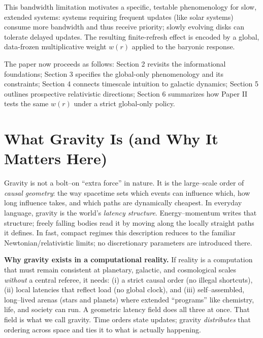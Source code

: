 \documentclass[usenatbib]{mnras}
\begin{document}
This bandwidth limitation motivates a specific, testable phenomenology for slow, extended systems: systems requiring frequent updates (like solar systems) consume more bandwidth and thus receive priority; slowly evolving disks can tolerate delayed updates. The resulting finite-refresh effect is encoded by a global, data-frozen multiplicative weight $w(r)$ applied to the baryonic response.

The paper now proceeds as follows: Section 2 revisits the informational foundations; Section 3 specifies the global-only phenomenology and its constraints; Section 4 connects timescale intuition to galactic dynamics; Section 5 outlines prospective relativistic directions; Section 6 summarizes how Paper II tests the same $w(r)$ under a strict global-only policy.

\section{What Gravity Is (and Why It Matters Here)}
\label{sec:what-gravity-is}

Gravity is not a bolt–on “extra force” in nature. It is the large–scale order of \emph{causal geometry}: the way spacetime sets which events can influence which, how long influence takes, and which paths are dynamically cheapest. In everyday language, gravity is the world’s \emph{latency structure}. Energy–momentum writes that structure; freely falling bodies read it by moving along the locally straight paths it defines. In fast, compact regimes this description reduces to the familiar Newtonian/relativistic limits; no discretionary parameters are introduced there.

\vspace{0.5em}
\noindent\textbf{Why gravity exists in a computational reality.}
If reality is a computation that must remain consistent at planetary, galactic, and cosmological scales \emph{without} a central referee, it needs:
(i) a strict causal order (no illegal shortcuts),
(ii) local latencies that reflect load (no global clock),
and (iii) self–assembled, long–lived arenas (stars and planets) where extended “programs” like chemistry, life, and society can run.
A geometric latency field does all three at once. That field is what we call gravity.
Time orders state updates; gravity \emph{distributes} that ordering across space and ties it to what is actually happening.
\end{document}
